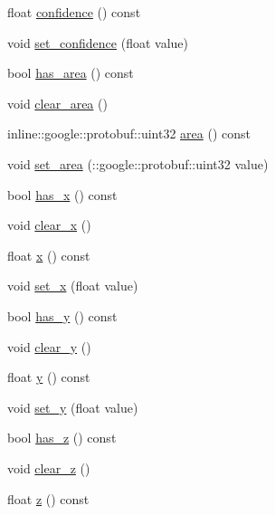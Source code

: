 \begin{DoxyCompactItemize}
\item 
float \hyperlink{class_s_s_l___detection_ball_ae98697b026abd184381dc63a2737a558}{confidence} () const 
\item 
void \hyperlink{class_s_s_l___detection_ball_a9076f6435de5b2ce81438f4cdbe9ccea}{set\-\_\-confidence} (float value)
\item 
bool \hyperlink{class_s_s_l___detection_ball_abcae7455c3d80e974233bbefe0a749f3}{has\-\_\-area} () const 
\item 
void \hyperlink{class_s_s_l___detection_ball_a63a6f30e09c249022f82163e856437e2}{clear\-\_\-area} ()
\item 
inline\-::google\-::protobuf\-::uint32 \hyperlink{class_s_s_l___detection_ball_a7fed4ae31101bbb281f4405504302b63}{area} () const 
\item 
void \hyperlink{class_s_s_l___detection_ball_a7d1492e3237211276389d2724edd352d}{set\-\_\-area} (\-::google\-::protobuf\-::uint32 value)
\item 
bool \hyperlink{class_s_s_l___detection_ball_a8247a5abb8bb045065417557e84757f7}{has\-\_\-x} () const 
\item 
void \hyperlink{class_s_s_l___detection_ball_aff983c7c5dd5dc9036fef95efbd9884c}{clear\-\_\-x} ()
\item 
float \hyperlink{class_s_s_l___detection_ball_a40163282ad895ed366b8c16e2931348b}{x} () const 
\item 
void \hyperlink{class_s_s_l___detection_ball_abb288437edc35248db638320ee1db760}{set\-\_\-x} (float value)
\item 
bool \hyperlink{class_s_s_l___detection_ball_ad6afb5b33e837c6c4a34a17e8679ef44}{has\-\_\-y} () const 
\item 
void \hyperlink{class_s_s_l___detection_ball_a74c07da29181601a6b0d8a3901df53e8}{clear\-\_\-y} ()
\item 
float \hyperlink{class_s_s_l___detection_ball_a0d8b73bf616a456b155ce5de050e7c27}{y} () const 
\item 
void \hyperlink{class_s_s_l___detection_ball_a03dc363c2654370ed842e74ce1bf5540}{set\-\_\-y} (float value)
\item 
bool \hyperlink{class_s_s_l___detection_ball_ae74ed2bb23b45f52024d348d4fe501bb}{has\-\_\-z} () const 
\item 
void \hyperlink{class_s_s_l___detection_ball_a670ca46e710cfd53539f5c19d063b742}{clear\-\_\-z} ()
\item 
float \hyperlink{class_s_s_l___detection_ball_a465a99bb99843df92329a4cfe83d4667}{z} () const 
\item 

\end{DoxyCompactItemize}

